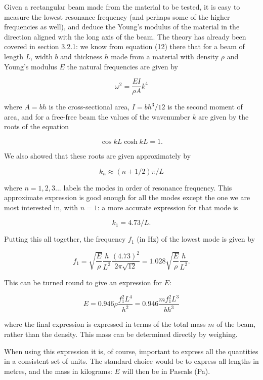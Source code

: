   Given a rectangular beam made from the material to be tested, it is easy to 
  measure the lowest resonance frequency (and perhaps some of the higher 
  frequencies as well), and deduce the Young's modulus of the material in the 
  direction aligned with the long axis of the beam. The theory has already been 
  covered in section 3.2.1: we know from equation (12) there that for a beam of 
  length $L$, width $b$ and thickness $h$ made from a material with density 
  $\rho$ and Young's modulus $E$ the natural frequencies are given by 

  $$\omega^2 = \dfrac{EI}{\rho A} k^4 \tag{1}$$ 

  where $A=bh$ is the cross-sectional area, $I=b h^3/12$ is the second moment 
  of area, and for a free-free beam the values of the wavenumber $k$ are given 
  by the roots of the equation 

  $$\cos kL \cosh kL =1 . \tag{2}$$ 

  We also showed that these roots are given approximately by 

  $$k_n \approx (n+1/2) \pi/L \tag{3}$$ 

  where $n=1,2,3...$ labels the modes in order of resonance frequency. This 
  approximate expression is good enough for all the modes except the one we are 
  most interested in, with $n=1$: a more accurate expression for that mode is 

  $$k_1 = 4.73/L . \tag{4}$$ 

  Putting this all together, the frequency $f_1$ (in Hz) of the lowest mode is 
  given by 

  $$f_1 = \sqrt{\dfrac{E}{\rho}} \dfrac{h}{L^2} \dfrac{(4.73)^2}{2 \pi 
  \sqrt{12}} = 1.028 \sqrt{\dfrac{E}{\rho}} \dfrac{h}{L^2} . \tag{5}$$ 

  This can be turned round to give an expression for $E$: 

  $$E=0.946 \rho \dfrac{f_1^2 L^4}{h^2}=0.946 \dfrac{m f_1^2 L^3}{b h^3} 
  \tag{6}$$ 

  where the final expression is expressed in terms of the total mass $m$ of the 
  beam, rather than the density. This mass can be determined directly by 
  weighing. 

  When using this expression it is, of course, important to express all the 
  quantities in a consistent set of units. The standard choice would be to 
  express all lengths in metres, and the mass in kilograms: $E$ will then be in 
  Pascals (Pa). 

